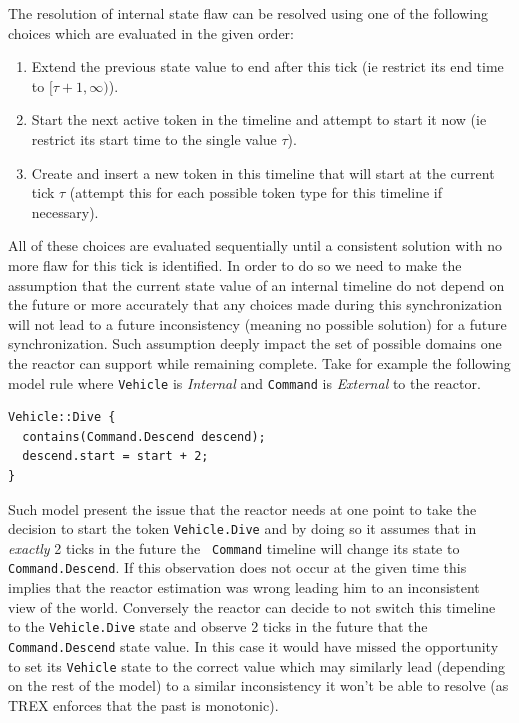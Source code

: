 The resolution of internal state flaw can be resolved using one of the
following choices which are evaluated in the given order:
\begin{enumerate}
\item Extend the previous state value to end after this tick (ie
  restrict its end time to $[\tau+1, \infty)$). 
\item Start the next active token in the timeline and
  attempt to start it now (ie restrict its start time to the single
  value $\tau$).
\item Create and insert a new token in this timeline that will start
  at the current tick $\tau$ (attempt this for each possible token
  type for this timeline if necessary). 
\end{enumerate}

All of these choices are evaluated sequentially until a consistent
solution with no more flaw for this tick is identified. In order to do
so we need to make the assumption that the current state value of an
internal timeline do not depend on the future or more accurately
that any choices made during this synchronization will not lead to a
future inconsistency (meaning no possible solution) for a future
synchronization. Such assumption deeply impact the set of possible
domains one the reactor can support while remaining complete. Take for
example the following model rule where {\tt Vehicle} is {\em Internal}
and {\tt Command} is {\em External} to the reactor.
\begin{verbatim}
Vehicle::Dive {
  contains(Command.Descend descend);
  descend.start = start + 2;
}
\end{verbatim}

Such model present the issue that the reactor needs at one point to
take the decision to start the token {\tt Vehicle.Dive} and by doing
so it assumes that in {\em exactly} 2 ticks in the future the {\tt
  Command} timeline will change its state to {\tt Command.Descend}. If
this observation does not occur at the given time this implies that
the reactor estimation was wrong leading him to an inconsistent view
of the world. Conversely the reactor can decide to not switch this
timeline to the {\tt Vehicle.Dive} state and observe 2 ticks in the
future that the {\tt Command.Descend} state value. In this case it
would have missed the opportunity to set its {\tt Vehicle} state to
the correct value which may similarly lead (depending on the rest of
the model) to a similar inconsistency it won't be able to resolve (as
TREX enforces that  the past is monotonic).

